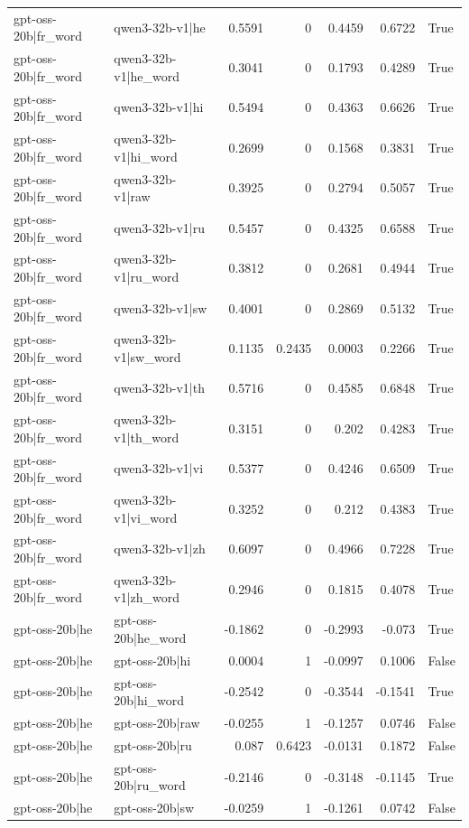 \begin{table}
\begin{tabular}{l l r r r r l}
gpt-oss-20b|fr_word & qwen3-32b-v1|he & 0.5591 & 0 & 0.4459 & 0.6722 & True \\
gpt-oss-20b|fr_word & qwen3-32b-v1|he_word & 0.3041 & 0 & 0.1793 & 0.4289 & True \\
gpt-oss-20b|fr_word & qwen3-32b-v1|hi & 0.5494 & 0 & 0.4363 & 0.6626 & True \\
gpt-oss-20b|fr_word & qwen3-32b-v1|hi_word & 0.2699 & 0 & 0.1568 & 0.3831 & True \\
gpt-oss-20b|fr_word & qwen3-32b-v1|raw & 0.3925 & 0 & 0.2794 & 0.5057 & True \\
gpt-oss-20b|fr_word & qwen3-32b-v1|ru & 0.5457 & 0 & 0.4325 & 0.6588 & True \\
gpt-oss-20b|fr_word & qwen3-32b-v1|ru_word & 0.3812 & 0 & 0.2681 & 0.4944 & True \\
gpt-oss-20b|fr_word & qwen3-32b-v1|sw & 0.4001 & 0 & 0.2869 & 0.5132 & True \\
gpt-oss-20b|fr_word & qwen3-32b-v1|sw_word & 0.1135 & 0.2435 & 0.0003 & 0.2266 & True \\
gpt-oss-20b|fr_word & qwen3-32b-v1|th & 0.5716 & 0 & 0.4585 & 0.6848 & True \\
gpt-oss-20b|fr_word & qwen3-32b-v1|th_word & 0.3151 & 0 & 0.202 & 0.4283 & True \\
gpt-oss-20b|fr_word & qwen3-32b-v1|vi & 0.5377 & 0 & 0.4246 & 0.6509 & True \\
gpt-oss-20b|fr_word & qwen3-32b-v1|vi_word & 0.3252 & 0 & 0.212 & 0.4383 & True \\
gpt-oss-20b|fr_word & qwen3-32b-v1|zh & 0.6097 & 0 & 0.4966 & 0.7228 & True \\
gpt-oss-20b|fr_word & qwen3-32b-v1|zh_word & 0.2946 & 0 & 0.1815 & 0.4078 & True \\
gpt-oss-20b|he & gpt-oss-20b|he_word & -0.1862 & 0 & -0.2993 & -0.073 & True \\
gpt-oss-20b|he & gpt-oss-20b|hi & 0.0004 & 1 & -0.0997 & 0.1006 & False \\
gpt-oss-20b|he & gpt-oss-20b|hi_word & -0.2542 & 0 & -0.3544 & -0.1541 & True \\
gpt-oss-20b|he & gpt-oss-20b|raw & -0.0255 & 1 & -0.1257 & 0.0746 & False \\
gpt-oss-20b|he & gpt-oss-20b|ru & 0.087 & 0.6423 & -0.0131 & 0.1872 & False \\
gpt-oss-20b|he & gpt-oss-20b|ru_word & -0.2146 & 0 & -0.3148 & -0.1145 & True \\
gpt-oss-20b|he & gpt-oss-20b|sw & -0.0259 & 1 & -0.1261 & 0.0742 & False \\

\end{tabular}
\end{table}
